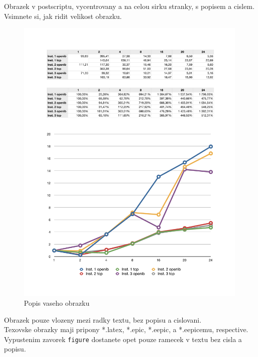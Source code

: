\documentclass[a4paper]{article}
\begin{document}
Obrazek v postscriptu, vycentrovany a na celou sirku stranky, 
s popisem a cislem. Vsimnete si, jak ridit velikost obrazku.
\begin{figure}[ht]
\centerline{\includegraphics[width=\textwidth]{graph.pdf}}
\caption{Popis vaseho obrazku}
\label{labelvasehoobrazku}
\end{figure}

Obrazek pouze vlozeny mezi radky textu, bez popisu a cislovani.\\

Texovske obrazky maji pripony *.latex, *.epic, *.eepic, a *.eepicemu, respective. 
% 
Vypustenim zavorek {\tt figure} dostanete opet pouze ramecek 
v textu bez cisla a popisu. 
\end{document}
